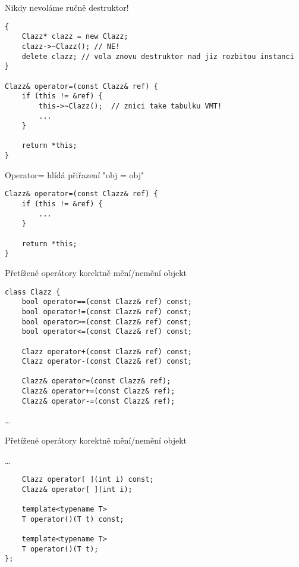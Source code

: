 \begin{frame}[fragile]
\begin{alertblock}{Nikdy nevoláme ručně destruktor!}
\begin{lstlisting}
{
	Clazz* clazz = new Clazz;
	clazz->~Clazz(); // NE!
	delete clazz; // vola znovu destruktor nad jiz rozbitou instanci
}

Clazz& operator=(const Clazz& ref) {
	if (this != &ref) {
		this->~Clazz();  // znici take tabulku VMT!
		...
	}
	
	return *this;
}
\end{lstlisting}
\end{alertblock}
\end{frame}

\begin{frame}[fragile]
\begin{exampleblock}{Operator= hlídá přiřazení "obj = obj"}
\begin{lstlisting}
Clazz& operator=(const Clazz& ref) {
	if (this != &ref) {
		...
	}
	
	return *this;
}
\end{lstlisting}
\end{exampleblock}
\end{frame}


\begin{frame}[fragile]
\begin{exampleblock}{Přetížené operátory korektně mění/nemění objekt}
\begin{lstlisting}
class Clazz {
	bool operator==(const Clazz& ref) const;
	bool operator!=(const Clazz& ref) const;	
	bool operator>=(const Clazz& ref) const;
	bool operator<=(const Clazz& ref) const;
	
	Clazz operator+(const Clazz& ref) const;
	Clazz operator-(const Clazz& ref) const;	

	Clazz& operator=(const Clazz& ref);	
	Clazz& operator+=(const Clazz& ref);
	Clazz& operator-=(const Clazz& ref);	
\end{lstlisting}
\ldots

\end{exampleblock}
\end{frame}

\begin{frame}[fragile]
\begin{exampleblock}{Přetížené operátory korektně mění/nemění objekt}

\ldots
\begin{lstlisting}
	Clazz operator[ ](int i) const;	
	Clazz& operator[ ](int i);	
	
	template<typename T>
	T operator()(T t) const;
		
	template<typename T>	
	T operator()(T t);		
};
\end{lstlisting}

\end{exampleblock}
\end{frame}
